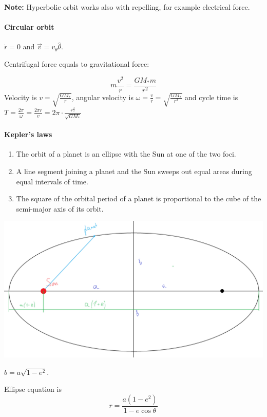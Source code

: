 \textbf{Note:} Hyperbolic orbit works also with repelling, for example electrical force. 
\paragraph{Circular orbit} $\dot{r} = 0$ and $\vec{v} = v_\theta \hat{\theta}$.

Centrifugal force equals to gravitational force:

$$m \frac{v^2}{r} = \frac{GM_*m}{r^2}$$
Velocity is $v = \sqrt{\frac{GM_*}{r}}$, angular velocity is $\omega = \frac{v}{r} = \sqrt{\frac{GM_*}{r^3}}$ and cycle time is $T=\frac{2\pi}{\omega} = \frac{2\pi r}{v} = 2\pi \cdot \frac{r^{\frac{3}{2}}}{\sqrt{GM_*}}$

\paragraph{Kepler's laws}
\begin{enumerate}
	\item  The orbit of a planet is an ellipse with the Sun at one of the two foci.
	\item A line segment joining a planet and the Sun sweeps out equal areas during equal intervals of time.
	\item The square of the orbital period of a planet is proportional to the cube of the semi-major axis of its orbit.
	
\end{enumerate}

\begin{center}
	\includegraphics[width=\linewidth]{./lect15/pic3.png}
\end{center}

$b = a\sqrt{1-e^2}$.

Ellipse equation is $$r = \frac{a\left( 1-e^2 \right)}{1-e\cos \theta}$$

